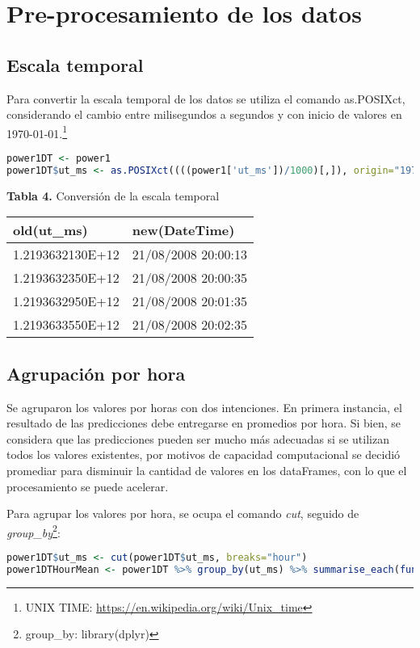 \documentclass[../Main.tex]{subfiles}
\begin{document}
\section{Pre-procesamiento de los datos}
\subsection{Escala temporal}
Para convertir la escala temporal de los datos se utiliza el comando as.POSIXct, considerando el cambio entre milisegundos a segundos y con inicio de valores en 1970-01-01.\footnote{UNIX TIME: \url{https://en.wikipedia.org/wiki/Unix_time}} 

\begin{lstlisting}[language=R]
power1DT <- power1
power1DT$ut_ms <- as.POSIXct((((power1['ut_ms'])/1000)[,]), origin="1970-01-01")
\end{lstlisting}

\begin{center}
\textbf{Tabla 4.} Conversión de la escala temporal\\
\begin{tabular}{|l|l|}
\hline
old(ut\_ms)           & new(DateTime)            \\ \hline
1.2193632130E+12 & 21/08/2008 20:00:13 \\ \hline
1.2193632350E+12 & 21/08/2008 20:00:35 \\ \hline
1.2193632950E+12 & 21/08/2008 20:01:35 \\ \hline
1.2193633550E+12 & 21/08/2008 20:02:35 \\ \hline
\end{tabular}
\end{center}

\subsection{Agrupación por hora}

Se agruparon los valores por horas con dos intenciones. En primera instancia, el resultado de las predicciones debe entregarse en promedios por hora. Si bien, se considera que las predicciones pueden ser mucho más adecuadas si se utilizan todos los valores existentes, por motivos de capacidad computacional se decidió promediar para disminuir la cantidad de valores en los dataFrames, con lo que el procesamiento se puede acelerar.
\newline \par
Para agrupar los valores por hora, se ocupa el comando \textit{cut}, seguido de \textit{group\_by}\footnote{group\_by: library(dplyr)}:
\newline \par
\begin{lstlisting}[language=R]
power1DT$ut_ms <- cut(power1DT$ut_ms, breaks="hour")
power1DTHourMean <- power1DT %>% group_by(ut_ms) %>% summarise_each(funs(mean))
\end{lstlisting}
\end{document}
